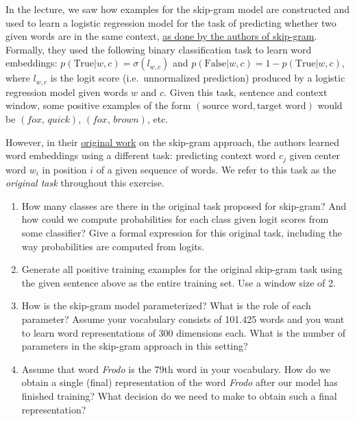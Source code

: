 \documentclass[11pt,a4paper]{article}
\begin{document}
In the lecture, we saw how examples for the skip-gram model are constructed and
used to learn a logistic regression model for the task of predicting whether two
given words are in the same context,
\href{https://arxiv.org/pdf/1310.4546.pdf}{\underline{as done by the authors of skip-gram}}.
Formally, they used the following binary classification task to learn word
embeddings: $p(\text{True}|w,c) = \sigma{(l_{w,c})}$ and
$p(\text{False}|w,c) = 1 - p(\text{True}|w,c)$, where $l_{w,c}$ is the logit
score (i.e.\ unnormalized prediction) produced by a logistic regression model
given words $w$ and $c$.
Given this task, sentence and context window, some positive examples of the
form $(\text{source word}, \text{target word})$ would be
$(\textit{fox, quick})$, $(\textit{fox, brown})$, etc.

However, in their
\href{https://arxiv.org/pdf/1301.3781.pdf}{\underline{original work}} on the
skip-gram approach, the authors learned word embeddings using a different task:
predicting context word $c_j$ given center word $w_i$ in position $i$ of a given
sequence of words.
We refer to this task as the \emph{original task} throughout this exercise.

\begin{enumerate}[label=(\alph*)]
    \item How many classes are there in the original task proposed for
          skip-gram? And how could we compute probabilities for each class given
          logit scores from some classifier? Give a formal expression for this
          original task, including the way probabilities are computed from
          logits.
    \item Generate all positive training examples for the original skip-gram
          task using the given sentence above as the entire training set.
          Use a window size of 2.
    \item How is the skip-gram model parameterized? What is the role of each
          parameter?
          Assume your vocabulary consists of 101.425 words and you want to learn
          word representations of 300 dimensions each.
          What is the number of parameters in the skip-gram approach in this
          setting?
    \item Assume that word \textit{Frodo} is the 79th word in your
          vocabulary.
          How do we obtain a single (final) representation of the word
          \textit{Frodo} after our model has finished training?
          What decision do we need to make to obtain such a final
          representation?
\end{enumerate}
\end{document}
